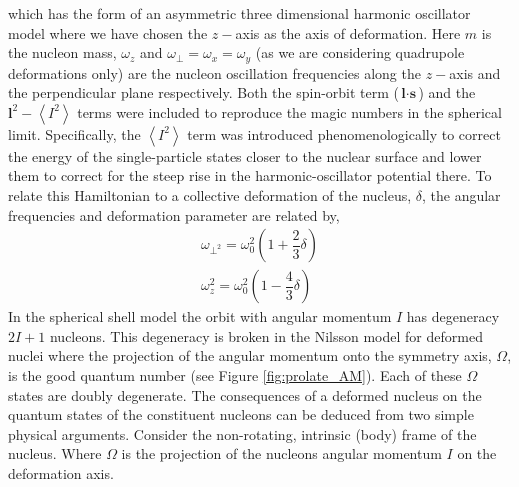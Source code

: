 \documentclass[10pt,a4paper, twoside, openright]{report}
\begin{document}
which has the form of an asymmetric three dimensional harmonic oscillator model where we have chosen the $z-$axis as the axis of deformation. Here $m$ is the nucleon mass, $\omega_z$ and $\omega_{\perp} = \omega_x = \omega_y$ (as we are considering quadrupole deformations only) are the nucleon oscillation frequencies along the $z-$axis and the perpendicular  plane respectively.  Both the spin-orbit term ($\textbf{l}\cdot \textbf{s}$) and the  $\textbf{l}^2 - \left<I^2\right>$ terms were included to reproduce the magic numbers in the spherical limit. Specifically, the $\left<I^2\right>$  term was introduced phenomenologically to correct the energy of the single-particle states closer to the nuclear surface and lower them to correct for the steep rise in the harmonic-oscillator potential there. 	To relate this Hamiltonian to a collective deformation of the nucleus, $\delta$, the angular frequencies and deformation parameter are related by,
\begin{align*}
\omega_{\perp^{2}} = \omega_0^2\left(1 + \dfrac{2}{3}\delta\right) \\
\omega_z^2 = \omega_0^2\left(1 - \dfrac{4}{3}\delta\right)
\end{align*}
\linebreak
In the spherical shell model the orbit with angular momentum $I$ has degeneracy $2I + 1$ nucleons. This degeneracy is broken in the Nilsson model for deformed nuclei where the projection of the angular momentum onto the symmetry axis, $\Omega$, is the good quantum number (see Figure \ref{fig:prolate_AM}). Each of these $\Omega$ states are doubly degenerate. The consequences of a deformed nucleus on the quantum states of the constituent nucleons can be deduced from two simple physical arguments. Consider the non-rotating, intrinsic (body) frame of the nucleus. Where $\Omega$ is the projection of the nucleons angular momentum $I$ on the deformation axis. 
\end{document}
